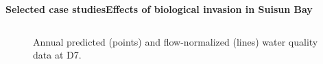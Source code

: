 \documentclass[serif]{beamer}\usepackage[]{graphicx}\usepackage[]{color}
\begin{document}
\begin{frame}{\textbf{Selected case studies}}{\textbf{Effects of biological invasion in Suisun Bay}}
\begin{columns}
\begin{column}{0.35\textwidth}
{}
\end{column}
\begin{column}{0.35\textwidth}
\end{column}
\end{columns}
\vspace{-0.05in}
\begin{figure}
\caption{Annual predicted (points) and flow-normalized (lines) water quality data at D7.}
\end{figure}
\end{frame}
\end{document}
